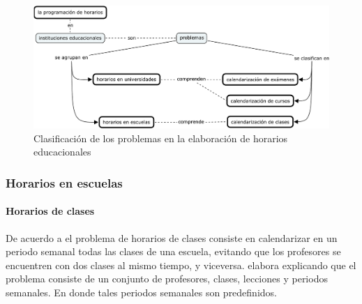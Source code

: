 \documentclass[spanish,draft,12pt,headsepline,footsepline,paper=letter]{scrreprt}
\begin{document}
\begin{figure}[hbtp]
\centering
\includegraphics[width=\textwidth]{timetabling_classification.pdf}
\caption[Clasificación del problema]{Clasificación de los problemas en la elaboración de horarios educacionales}
\label{fig:timetabling_classification}
\end{figure}

\subsubsection{Horarios en escuelas}


\paragraph{Horarios de clases}

De acuerdo a \citet[p.~88]{schaerf99a-survey-of-automated} el problema de horarios de clases consiste en calendarizar en un periodo semanal todas las clases de una escuela, evitando que los profesores se encuentren con dos clases al mismo tiempo, y viceversa. \citet[p.~10,11]{abdullah06heuristic-approaches} elabora explicando que el problema consiste de un conjunto de profesores, clases, lecciones y periodos semanales. En donde tales periodos semanales son predefinidos.
\end{document}
